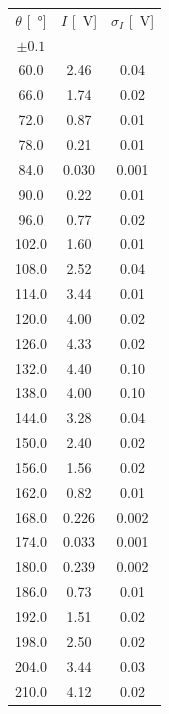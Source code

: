 \documentclass[10pt,oneside,a4paper]{article}
\begin{document}
\begin{minipage}[t]{0.3\linewidth}
\begin{center}
\label{tab:taratura_lambda2}
\begin{tabular}{c|c|c}
\toprule
     $\theta$ [\SI{}{\degree}] &    $I$ [\SI{}{V}] &   $\sigma_I$ [\SI{}{V}]\\
     $\pm 0.1$ & & \\
\midrule
  60.0 &  2.46 &  0.04 \\
  66.0 &  1.74 &  0.02 \\
  72.0 &  0.87 &  0.01 \\
  78.0 &  0.21 &  0.01 \\
  84.0 &  0.030 &  0.001 \\
  90.0 &  0.22 &  0.01 \\
  96.0 &  0.77 &  0.02 \\
 102.0 &  1.60 &  0.01 \\
 108.0 &  2.52 &  0.04 \\
 114.0 &  3.44 &  0.01 \\
 120.0 &  4.00 &  0.02 \\
 126.0 &  4.33 &  0.02 \\
 132.0 &  4.40 &  0.10 \\
 138.0 &  4.00 &  0.10 \\
 144.0 &  3.28 &  0.04 \\
 150.0 &  2.40 &  0.02 \\
 156.0 &  1.56 &  0.02 \\
 162.0 &  0.82 &  0.01 \\
 168.0 &  0.226 &  0.002 \\
 174.0 &  0.033 &  0.001 \\
 180.0 &  0.239 &  0.002 \\
 186.0 &  0.73 &  0.01 \\
 192.0 &  1.51 &  0.02 \\
 198.0 &  2.50 &  0.02 \\
 204.0 &  3.44 &  0.03 \\
 210.0 &  4.12 &  0.02 \\
\bottomrule
\end{tabular}
\end{center}
\end{minipage}
\hspace{1em}
\end{document}
